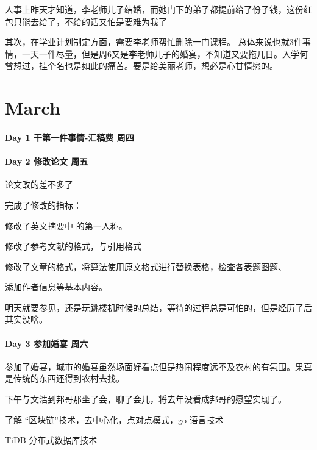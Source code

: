 \documentclass[UTF8,a4paper,8pt]{ctexart}
\begin{document}
		人事上昨天才知道，李老师儿子结婚，而她门下的弟子都提前给了份子钱，这份红包只能去给了，不给的话又怕是要难为我了
		
		其次，在学业计划制定方面，需要李老师帮忙删除一门课程。 总体来说也就3件事情，一天一件尽量，但是周6又是李老师儿子的婚宴，不知道又要拖几日。入学何曾想过，挂个名也是如此的痛苦。要是给美丽老师，想必是心甘情愿的。
		
\section{March}
 	 \paragraph{Day 1   干第一件事情-汇稿费   周四 \quad     }
 	 
 	 \paragraph{Day 2   修改论文    周五 \quad     }
	 	 论文改的差不多了
	 	 
	 	 完成了修改的指标：
	 	 
	 	 修改了英文摘要中 的第一人称。
	 	 
	 	 修改了参考文献的格式，与引用格式
	 	 
	 	 修改了文章的格式，将算法使用原文格式进行替换表格，检查各表题图题、
	 	 
	 	 添加作者信息等基本内容。
	 	 
	 	 明天就要参见，还是玩跳楼机时候的总结，等待的过程总是可怕的，但是经历了后其实没啥。
 	 \paragraph{Day 3   参加婚宴    周六 \quad     }
		 参加了婚宴，城市的婚宴虽然场面好看点但是热闹程度远不及农村的有氛围。果真是传统的东西还得到农村去找。
		 	 
		 下午与文浩到邦哥那坐了会，聊了会儿，将去年没看成邦哥的愿望实现了。
		 
		 了解-“区块链”技术，去中心化，点对点模式，go 语言技术
		 
		 TiDB 分布式数据库技术
		 
\end{document}
